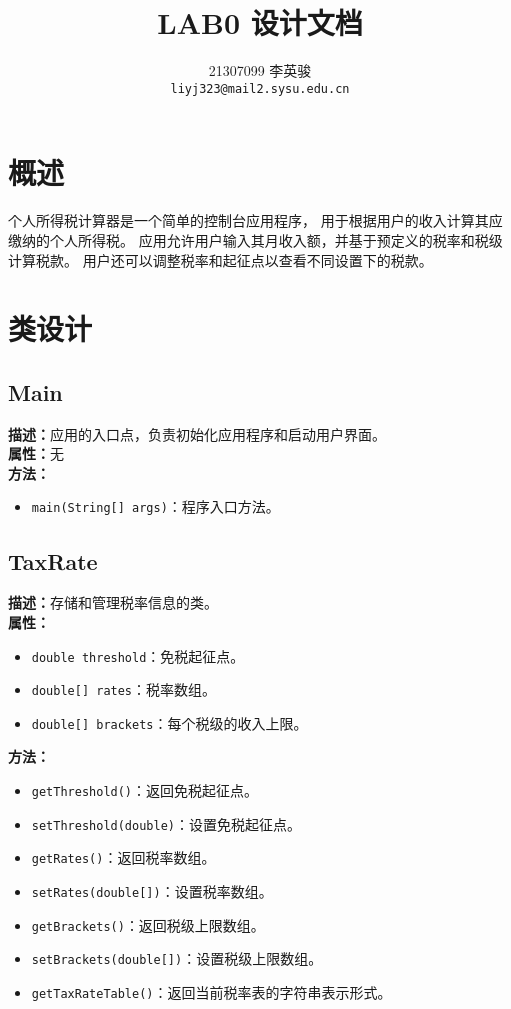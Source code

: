 \documentclass{article}
\title{LAB0 设计文档}
\author{%
    21307099 李英骏\\
    \texttt{liyj323@mail2.sysu.edu.cn} \\
}
\begin{document}
\maketitle
\tableofcontents

\section{概述}
个人所得税计算器是一个简单的控制台应用程序，
用于根据用户的收入计算其应缴纳的个人所得税。
应用允许用户输入其月收入额，并基于预定义的税率和税级计算税款。
用户还可以调整税率和起征点以查看不同设置下的税款。

\section{类设计}

\subsection{Main}
\textbf{描述：}应用的入口点，负责初始化应用程序和启动用户界面。\\
\textbf{属性：}无\\
\textbf{方法：}
\begin{itemize}
    \item \texttt{main(String[] args)}：程序入口方法。
\end{itemize}

\subsection{TaxRate}
\textbf{描述：}存储和管理税率信息的类。\\
\textbf{属性：}
\begin{itemize}
    \item \texttt{double threshold}：免税起征点。
    \item \texttt{double[] rates}：税率数组。
    \item \texttt{double[] brackets}：每个税级的收入上限。
\end{itemize}
\textbf{方法：}
\begin{itemize}
    \item \texttt{getThreshold()}：返回免税起征点。
    \item \texttt{setThreshold(double)}：设置免税起征点。
    \item \texttt{getRates()}：返回税率数组。
    \item \texttt{setRates(double[])}：设置税率数组。
    \item \texttt{getBrackets()}：返回税级上限数组。
    \item \texttt{setBrackets(double[])}：设置税级上限数组。
    \item \texttt{getTaxRateTable()}：返回当前税率表的字符串表示形式。
\end{itemize}
\end{document}
